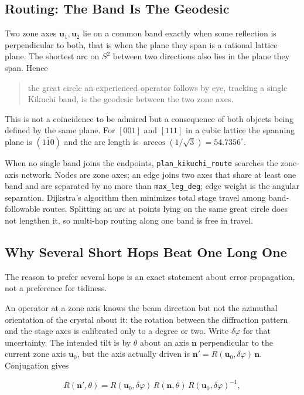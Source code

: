 \subsection{Routing: The Band Is The Geodesic}

Two zone axes $\mathbf{u}_1, \mathbf{u}_2$ lie on a common band exactly when some
reflection is perpendicular to both, that is when the plane they span is a
rational lattice plane. The shortest arc on $S^2$ between two directions also lies
in the plane they span. Hence

\begin{quote}
  the great circle an experienced operator follows by eye, tracking a single
  Kikuchi band, is the geodesic between the two zone axes.
\end{quote}

This is not a coincidence to be admired but a consequence of both objects being
defined by the same plane. For $[001]$ and $[111]$ in a cubic lattice the spanning
plane is $(1\bar{1}0)$ and the arc length is $\arccos(1/\sqrt{3}) =
54.7356^\circ$.

When no single band joins the endpoints, \texttt{plan\_kikuchi\_route} searches
the zone-axis network. Nodes are zone axes; an edge joins two axes that share at
least one band and are separated by no more than \texttt{max\_leg\_deg}; edge
weight is the angular separation. Dijkstra's algorithm then minimizes total stage
travel among band-followable routes. Splitting an arc at points lying on the same
great circle does not lengthen it, so multi-hop routing along one band is free in
travel.

\subsection{Why Several Short Hops Beat One Long One}

The reason to prefer several hops is an exact statement about error propagation,
not a preference for tidiness.

An operator at a zone axis knows the beam direction but not the azimuthal
orientation of the crystal about it: the rotation between the diffraction pattern
and the stage axes is calibrated only to a degree or two. Write $\delta\varphi$
for that uncertainty. The intended tilt is by $\theta$ about an axis $\mathbf{n}$
perpendicular to the current zone axis $\mathbf{u}_0$, but the axis actually
driven is $\mathbf{n}' = R(\mathbf{u}_0, \delta\varphi)\,\mathbf{n}$. Conjugation
gives

\[
  R(\mathbf{n}', \theta)
  = R(\mathbf{u}_0, \delta\varphi)\,R(\mathbf{n}, \theta)\,
    R(\mathbf{u}_0, \delta\varphi)^{-1},
\]

